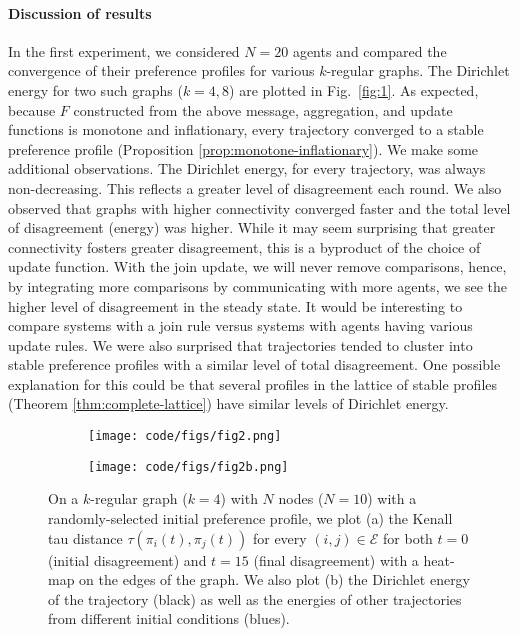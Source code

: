 \documentclass[conference]{ieeeconf}
\newcommand{\E}{\mathcal{E}}
\begin{document}
\paragraph*{Discussion of results}
In the first experiment, we considered $N=20$ agents and compared the convergence of their preference profiles for various $k$-regular graphs. The Dirichlet energy for two such graphs ($k=4,8$) are plotted in Fig.~\ref{fig:1}. As expected, because $F$ constructed from the above message, aggregation, and update functions is monotone and inflationary, every trajectory converged to a stable preference profile (Proposition \ref{prop:monotone-inflationary}). We make some additional observations. The Dirichlet energy, for every trajectory, was always non-decreasing. This reflects a greater level of disagreement each round. We also observed that graphs with higher connectivity converged faster and the total level of disagreement (energy) was higher. While it may seem surprising that greater connectivity fosters greater disagreement, this is a byproduct of the choice of update function. With the join update, we will never remove comparisons, hence, by integrating more comparisons by communicating with more agents, we see the higher level of disagreement in the steady state. It would be interesting to compare systems with a join rule versus systems with agents having various update rules. We were also surprised that trajectories tended to cluster into stable preference profiles with a similar level of total disagreement. One possible explanation for this could be that several profiles in the lattice of stable profiles (Theorem \ref{thm:complete-lattice}) have similar levels of Dirichlet energy.

\begin{figure*}[h]
    \begin{subfigure}[b]{0.6\textwidth}
    \texttt{[image: code/figs/fig2.png]}
    \caption{}
    \label{fig:2a}
    \end{subfigure}
    \hfill
    \begin{subfigure}[b]{0.4\textwidth}
    \centering
    \texttt{[image: code/figs/fig2b.png]}
    \caption{}
    \label{fig:2b}
    \end{subfigure}
    \caption{On a $k$-regular graph ($k=4$) with $N$ nodes ($N=10$) with a randomly-selected initial preference profile, we plot (a) the Kenall tau distance $\tau(\pi_i(t),\pi_j(t))$ for every $(i,j) \in \E$ for both $t=0$ (initial disagreement) and $t=15$ (final disagreement) with a heat-map on the edges of the graph. We also plot (b) the Dirichlet energy of the trajectory (black) as well as the energies of other trajectories from different initial conditions (blues).}
    \label{fig:2}
\end{figure*}
\end{document}
